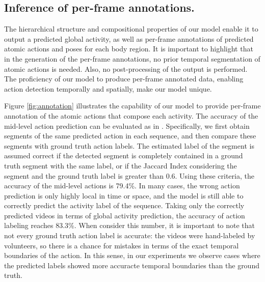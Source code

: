 
\subsection{Inference of per-frame annotations.}
\label{subsec:action_annotation}
The hierarchical structure and compositional
properties of our model enable it to output a predicted global activity,
as well as per-frame annotations of predicted atomic actions and poses for each body
region.
It is important to highlight that in the generation of the per-frame annotations, no prior temporal 
segmentation of atomic actions is needed. Also, no post-processing of the output is performed. The  
proficiency of our model to produce
per-frame annotated data, enabling action detection temporally and
spatially, make our model unique. 

Figure \ref{fig:annotation} illustrates
the capability of our model to provide per-frame annotation of the atomic
actions that compose each activity. The accuracy of
the mid-level action prediction can be evaluated as in \cite{Wei2013}.
Specifically, we first obtain segments of the same predicted action in each
sequence, and then compare these segments with ground truth action labels. The
estimated label of the segment is assumed correct if the detected segment is
completely contained in a ground truth segment with the same label, or if the
Jaccard Index considering the segment and the ground truth label is greater
than 0.6. Using these criteria, the accuracy of the mid-level actions is
79.4\%. In many cases, the wrong action prediction is only highly local in time
or space, and the model is still able to correctly predict the activity label
of the sequence. Taking only the correctly predicted videos in terms of global
activity prediction, the accuracy of action labeling reaches 83.3\%. When consider this number, it 
is
important to note that not every ground truth action label is accurate: the
videos were hand-labeled by volunteers, so there is a chance for mistakes in
terms of the exact temporal boundaries of the action. In
this sense, in our experiments we observe cases where the predicted
labels showed more accuracte temporal boundaries than the ground 
truth.

